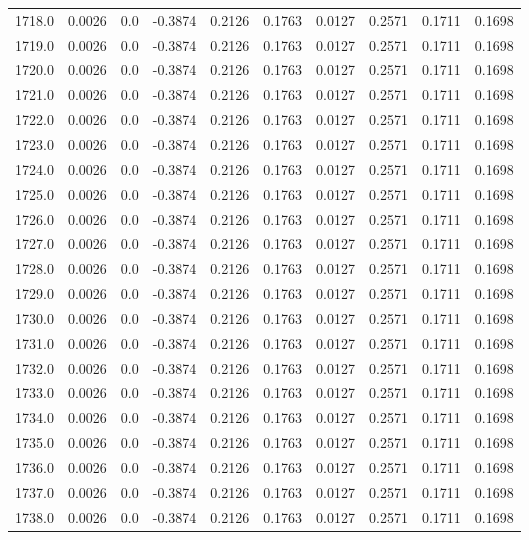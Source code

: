 \begin{longtable}{lrrrrrrrrr}
1718.0 & 0.0026 & 0.0 & -0.3874 & 0.2126 & 0.1763 & 0.0127 & 0.2571 & 0.1711 & 0.1698 \\
1719.0 & 0.0026 & 0.0 & -0.3874 & 0.2126 & 0.1763 & 0.0127 & 0.2571 & 0.1711 & 0.1698 \\
1720.0 & 0.0026 & 0.0 & -0.3874 & 0.2126 & 0.1763 & 0.0127 & 0.2571 & 0.1711 & 0.1698 \\
1721.0 & 0.0026 & 0.0 & -0.3874 & 0.2126 & 0.1763 & 0.0127 & 0.2571 & 0.1711 & 0.1698 \\
1722.0 & 0.0026 & 0.0 & -0.3874 & 0.2126 & 0.1763 & 0.0127 & 0.2571 & 0.1711 & 0.1698 \\
1723.0 & 0.0026 & 0.0 & -0.3874 & 0.2126 & 0.1763 & 0.0127 & 0.2571 & 0.1711 & 0.1698 \\
1724.0 & 0.0026 & 0.0 & -0.3874 & 0.2126 & 0.1763 & 0.0127 & 0.2571 & 0.1711 & 0.1698 \\
1725.0 & 0.0026 & 0.0 & -0.3874 & 0.2126 & 0.1763 & 0.0127 & 0.2571 & 0.1711 & 0.1698 \\
1726.0 & 0.0026 & 0.0 & -0.3874 & 0.2126 & 0.1763 & 0.0127 & 0.2571 & 0.1711 & 0.1698 \\
1727.0 & 0.0026 & 0.0 & -0.3874 & 0.2126 & 0.1763 & 0.0127 & 0.2571 & 0.1711 & 0.1698 \\
1728.0 & 0.0026 & 0.0 & -0.3874 & 0.2126 & 0.1763 & 0.0127 & 0.2571 & 0.1711 & 0.1698 \\
1729.0 & 0.0026 & 0.0 & -0.3874 & 0.2126 & 0.1763 & 0.0127 & 0.2571 & 0.1711 & 0.1698 \\
1730.0 & 0.0026 & 0.0 & -0.3874 & 0.2126 & 0.1763 & 0.0127 & 0.2571 & 0.1711 & 0.1698 \\
1731.0 & 0.0026 & 0.0 & -0.3874 & 0.2126 & 0.1763 & 0.0127 & 0.2571 & 0.1711 & 0.1698 \\
1732.0 & 0.0026 & 0.0 & -0.3874 & 0.2126 & 0.1763 & 0.0127 & 0.2571 & 0.1711 & 0.1698 \\
1733.0 & 0.0026 & 0.0 & -0.3874 & 0.2126 & 0.1763 & 0.0127 & 0.2571 & 0.1711 & 0.1698 \\
1734.0 & 0.0026 & 0.0 & -0.3874 & 0.2126 & 0.1763 & 0.0127 & 0.2571 & 0.1711 & 0.1698 \\
1735.0 & 0.0026 & 0.0 & -0.3874 & 0.2126 & 0.1763 & 0.0127 & 0.2571 & 0.1711 & 0.1698 \\
1736.0 & 0.0026 & 0.0 & -0.3874 & 0.2126 & 0.1763 & 0.0127 & 0.2571 & 0.1711 & 0.1698 \\
1737.0 & 0.0026 & 0.0 & -0.3874 & 0.2126 & 0.1763 & 0.0127 & 0.2571 & 0.1711 & 0.1698 \\
1738.0 & 0.0026 & 0.0 & -0.3874 & 0.2126 & 0.1763 & 0.0127 & 0.2571 & 0.1711 & 0.1698 \\

\end{longtable}
